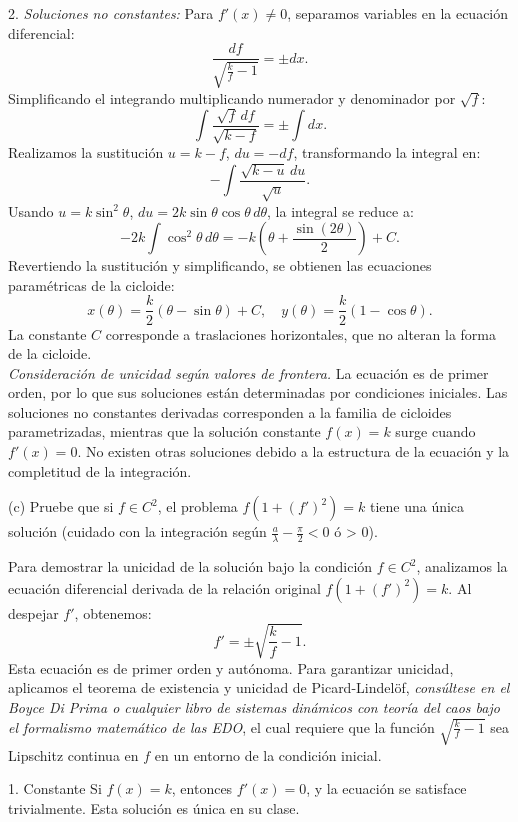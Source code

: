 \documentclass{elsarticle}
\begin{document}
2. \textit{Soluciones no constantes:  }
   Para \( f'(x) \neq 0 \), separamos variables en la ecuación diferencial:  
   \[
   \frac{df}{\sqrt{\frac{k}{f} - 1}} = \pm dx.
   \]  
   Simplificando el integrando multiplicando numerador y denominador por \( \sqrt{f} \):  
   \[
   \int \frac{\sqrt{f} \, df}{\sqrt{k - f}} = \pm \int dx.
   \]  
   Realizamos la sustitución \( u = k - f \), \( du = -df \), transformando la integral en:  
   \[
   -\int \frac{\sqrt{k - u} \, du}{\sqrt{u}}.
   \]  
   Usando \( u = k \sin^2\theta \), \( du = 2k \sin\theta \cos\theta \, d\theta \), la integral se reduce a:  
   \[
   -2k \int \cos^2\theta \, d\theta = -k \left(\theta + \frac{\sin(2\theta)}{2}\right) + C.
   \]  
   Revertiendo la sustitución y simplificando, se obtienen las ecuaciones paramétricas de la cicloide:  
   \[
   x(\theta) = \frac{k}{2}(\theta - \sin\theta) + C, \quad y(\theta) = \frac{k}{2}(1 - \cos\theta).
   \]  
   La constante \( C \) corresponde a traslaciones horizontales, que no alteran la forma de la cicloide. \\ 
\textit{Consideración de unicidad según valores de frontera.} 
   La ecuación es de primer orden, por lo que sus soluciones están determinadas por condiciones iniciales. Las soluciones no constantes derivadas corresponden a la familia de cicloides parametrizadas, mientras que la solución constante \( f(x) = k \) surge cuando \( f'(x) = 0 \). No existen otras soluciones debido a la estructura de la ecuación y la completitud de la integración.  

(c) Pruebe que si \( f \in C^2 \), el problema \( f(1 + (f')^2) = k \) tiene una única solución (cuidado con la integración según \( \frac{a}{\lambda} - \frac{\pi}{2} < 0 \) ó > 0).

Para demostrar la unicidad de la solución bajo la condición \( f \in C^2 \), analizamos la ecuación diferencial derivada de la relación original \( f(1 + (f')^2) = k \). Al despejar \( f' \), obtenemos:  
\[
f' = \pm \sqrt{\frac{k}{f} - 1}.
\]  
Esta ecuación es de primer orden y autónoma. Para garantizar unicidad, aplicamos el teorema de existencia y unicidad de Picard-Lindelöf, \textit{consúltese en el Boyce Di Prima o cualquier libro de sistemas dinámicos con teoría del caos bajo el formalismo matemático de las EDO}, el cual requiere que la función \( \sqrt{\frac{k}{f} - 1} \) sea Lipschitz continua en \( f \) en un entorno de la condición inicial.  

1. Constante
   Si \( f(x) = k \), entonces \( f'(x) = 0 \), y la ecuación se satisface trivialmente. Esta solución es única en su clase.  
\end{document}
